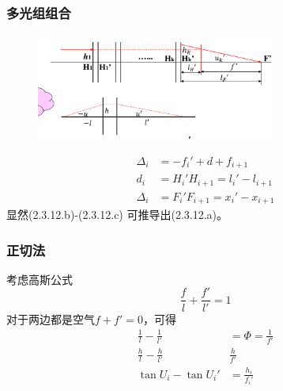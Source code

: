 \subsubsection{多光组组合}
        \begin{figure}[H]
            \centering
            \includegraphics[width=8cm]{img/3.17}
            \end{figure}
\begin{align}
    \Delta_i &=-f_i'+d+f_{i+1} \tag{2.3.12.a} \\
     d_i&= H_i'H_{i+1}=l_i'-l_{i+1}\tag{2.3.12.b} \\
    \Delta_i&=F_i'F_{i+1}=x_i'-x_{i+1}\tag{2.3.12.c}
\end{align}
显然(2.3.12.b)-(2.3.12.c) 可推导出(2.3.12.a)。
\subsubsection{正切法}
考虑高斯公式
$$
\frac{f}{l}+\frac{f'}{l'}=1
$$
对于两边都是空气$f+f'=0$，可得
\begin{align}
\frac{1}{l}-\frac{1}{l'}&=\Phi=\frac{1}{f'}\tag{2.3.13.bef.1} \\
\frac{h}{l}-\frac{h}{l'}&\frac{h}{f'}\tag{2.3.13.bef.2} \\
 \tan U_i -\tan U_i'&=\frac{h_i}{f_i'}\tag{2.3.13} 
\end{align}

